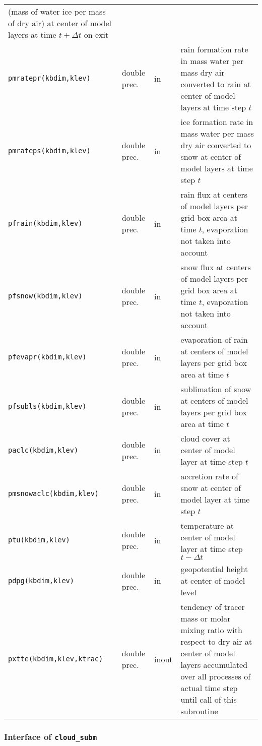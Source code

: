 \begin{longtable}{l@{\extracolsep\fill}llp{7.0cm}}
(mass of water ice per mass of dry air)
at center of model layers at time $t+\Delta t$ on exit \\
{\tt pmratepr(kbdim,klev)} & double prec. & in & rain formation rate 
in mass water per mass dry air converted to rain at center of model
layers at time step $t$\\
{\tt pmrateps(kbdim,klev)} & double prec. & in & ice formation rate 
in mass water per mass dry air converted to snow at center of model
layers at time step $t$\\
{\tt pfrain(kbdim,klev)} & double prec. & in & rain flux at centers of
model layers per grid box area at time $t$, evaporation not taken into account \\
{\tt pfsnow(kbdim,klev)} & double prec. & in & snow flux at centers of
model layers per grid box area at time $t$, evaporation not taken into account \\
{\tt pfevapr(kbdim,klev)} & double prec. & in & evaporation of rain at
centers of model layers per grid box area at time $t$ \\
{\tt pfsubls(kbdim,klev)} & double prec. & in & sublimation of snow at
centers of model layers per grid box area at time $t$ \\
{\tt paclc(kbdim,klev)} & double prec. & in & cloud cover at center of
model layer at time step $t$\\
{\tt pmsnowaclc(kbdim,klev)} & double prec. & in & accretion rate of
snow at center of
model layer at time step $t$\\
{\tt ptu(kbdim,klev)} & double prec. & in & temperature at center of
model layer at time step $t-\Delta t$\\
{\tt pdpg(kbdim,klev)} & double prec. & in & geopotential height at
center of model level \\
{\tt pxtte(kbdim,klev,ktrac)} & double prec. & inout & tendency of tracer
mass or molar mixing ratio with respect to dry air at center of model
layers accumulated over all processes of actual time
step until call of this subroutine \\
\end{longtable}

\subsubsection{Interface of {\tt cloud\_subm}}

